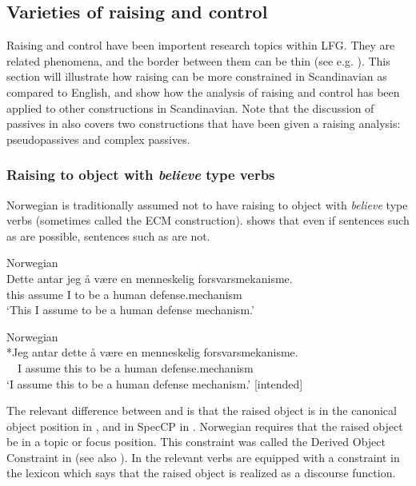 \documentclass[output=paper,hidelinks]{langscibook}
\begin{document}
\subsection{Varieties of raising and control}

Raising and control have been importent research topics within LFG. They are related phenomena, and the border between them can be thin (see e.g. \citealt{Lodrup08}). This section will illustrate how raising can be more constrained in Scandinavian as compared to English, and show how the analysis of raising and control has  been applied to other constructions in Scandinavian. Note that the discussion of passives in  also covers two constructions that have been given a raising analysis: pseudopassives and complex passives.

\subsubsection{Raising to object with \textit{believe} type verbs}

Norwegian is traditionally assumed not to have raising to object with \textit{believe} type verbs (sometimes called the ECM construction). \citet{Lodrup08b}  shows that even if sentences such as  are possible, sentences such as  are not.



\ea\label{ex:Scandinavian:63} Norwegian\\
\gll
 {Dette} {antar} {jeg} {å} {være} {en} {menneskelig} {forsvarsmekanisme}\textsc{.}\\
 this assume I to be a human defense.mechanism \\
\glt `This I assume to be a human defense mechanism.'\z



\ea\label{ex:Scandinavian:64} Norwegian\\
\gll
 *{Jeg} {antar} {dette} {å} {være} {en} {menneskelig} {forsvarsmekanisme}\textsc{.}\\
 ~~I assume this to be a human defense.mechanism \\
\glt `I assume this to be a human defense mechanism.' [intended]\z

\noindent The relevant difference between  and  is that the raised object is in the canonical object position in , and in SpecCP in . Norwegian requires that the raised object be in a topic or focus position. This constraint was called the Derived Object Constraint in \citet{Postal74} (see also \citealt{Kayne81}). In \citet{Lodrup08b} the relevant verbs are equipped with a constraint in the lexicon which says that the raised object is realized as a discourse function.
\end{document}
